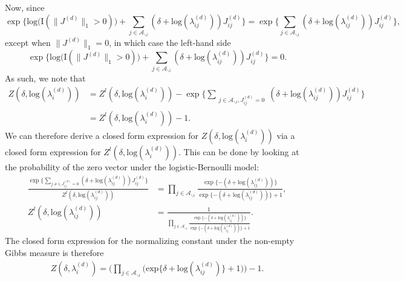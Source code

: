 \documentclass[a4paper]{article}
\begin{document}
  	 Now, since 
  	\begin{equation*}
  	\exp\Big\{ \mbox{log}\big(\text{I}(\lVert J^{(d)} \rVert_1> 0 )\big) + \sum_{j \in \mathcal{A}_{\backslash i}} (\delta+\mbox{log}(\lambda_{ij}^{(d)}))J_{ij}^{(d)} \Big\}= \exp\Big\{ \sum_{j \in \mathcal{A}_{\backslash i}} (\delta+\mbox{log}(\lambda_{ij}^{(d)}))J_{ij}^{(d)} \Big\},
  	\end{equation*} except when $\lVert J^{(d)} \rVert_1=0$, in which case the left-hand side 
  	\begin{equation*}
\exp\Big\{ \mbox{log}\big(\text{I}(\lVert J^{(d)} \rVert_1> 0 )\big) + \sum_{j \in \mathcal{A}_{\backslash i}} (\delta+\mbox{log}(\lambda_{ij}^{(d)}))J_{ij}^{(d)} \Big\}= 0.  	
\end{equation*}
 As such, we note that 
 \begin{equation*}
 \begin{aligned}
Z(\delta,\mbox{log}(\lambda_{i}^{(d)}))& = Z^{l}(\delta,\mbox{log}(\lambda_{i}^{(d)})) -  \exp\Big\{ \sum\limits_{\substack{j \in \mathcal{A}_{\backslash i}, J^{(d)}_{ij}=0}} (\delta+\mbox{log}(\lambda_{ij}^{(d)}))J_{ij}^{(d)} \Big\}
\\& = Z^{l}(\delta,\mbox{log}(\lambda_{i}^{(d)})) -  1.
\end{aligned}
 \end{equation*}
   We can therefore derive a closed form expression for $Z(\delta,\mbox{log}(\lambda_{i}^{(d)}))$ via a closed form expression for $Z^{l}(\delta,\mbox{log}(\lambda_{i}^{(d)}))$. This can be done by looking at the probability of the zero vector under the logistic-Bernoulli model:
   \begin{equation*}
   \begin{aligned}
\frac{\exp\Big\{\sum_{j\neq i, J^{(d)}_{ij}=0} (\delta+\mbox{log}(\lambda_{ij}^{(d)}))J_{ij}^{(d)} \Big\}}{Z^{l}(\delta,\mbox{log}(\lambda_{ij}^{(d)}))} &= \prod_{j \in \mathcal{A}_{\backslash i} }   \frac{ \exp\{-(\delta+\mbox{log}(\lambda_{ij}^{(d)}))\}}{\exp\{-(\delta+\mbox{log}(\lambda_{ij}^{(d)}))\} + 1},\\
Z^{l}(\delta,\mbox{log}(\lambda_{ij}^{(d)})) &= \frac{1}{\prod_{j \in \mathcal{A}_{\backslash i}}   \frac{ \exp\{-(\delta+\mbox{log}(\lambda_{ij}^{(d)}))\}}{\exp\{-(\delta+\mbox{log}(\lambda_{ij}^{(d)}))\} + 1}}.
  	 \end{aligned}  
  	 \end{equation*}
  	 The closed form expression for the normalizing constant under the non-empty Gibbs measure is therefore    \begin{equation*}
  	 \begin{aligned}Z(\delta,\lambda_i^{(d)}) = \Big(\prod_{j \in \mathcal{A}_{\backslash i}} \Big(\mbox{exp}\{\delta+\mbox{log}(\lambda_{ij}^{(d)})\} + 1\Big)\Big)-1.
  	  \end{aligned}  
  	  \end{equation*}
\end{document}
